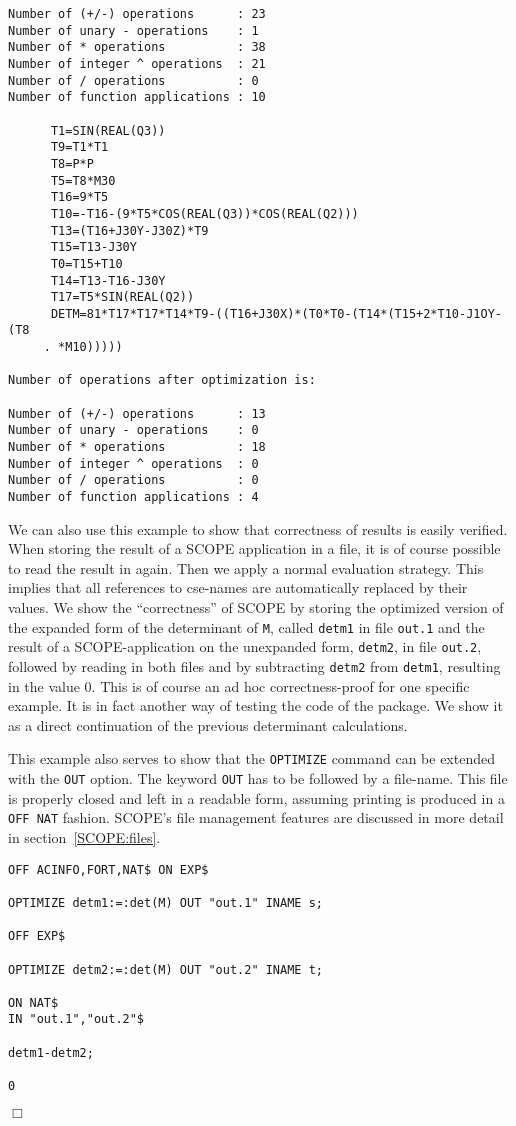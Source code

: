 {\begin{verbatim}
Number of (+/-) operations      : 23
Number of unary - operations    : 1
Number of * operations          : 38
Number of integer ^ operations  : 21
Number of / operations          : 0
Number of function applications : 10

      T1=SIN(REAL(Q3))
      T9=T1*T1
      T8=P*P
      T5=T8*M30
      T16=9*T5
      T10=-T16-(9*T5*COS(REAL(Q3))*COS(REAL(Q2)))
      T13=(T16+J30Y-J30Z)*T9
      T15=T13-J30Y
      T0=T15+T10
      T14=T13-T16-J30Y
      T17=T5*SIN(REAL(Q2))
      DETM=81*T17*T17*T14*T9-((T16+J30X)*(T0*T0-(T14*(T15+2*T10-J1OY-(T8
     . *M10)))))

Number of operations after optimization is:

Number of (+/-) operations      : 13
Number of unary - operations    : 0
Number of * operations          : 18
Number of integer ^ operations  : 0
Number of / operations          : 0
Number of function applications : 4
\end{verbatim}}

We can also use this example to show that correctness of results is
easily verified. When storing
the result of a SCOPE application in a file, it is of course possible
to read the result in again. Then we apply a normal {\REDUCE} evaluation
strategy. This implies that all references to cse-names are automatically
replaced by their values.  We show the ``correctness'' of SCOPE by
storing the optimized version of the expanded form of the determinant
of {\tt M}, called {\tt detm1} in file {\tt out.1} and the result of a
SCOPE-application on the unexpanded form, {\tt detm2}, in file {\tt out.2},
followed by reading in both files and by subtracting {\tt detm2}
from {\tt detm1}, resulting in the value 0.
This is of course an ad hoc correctness-proof for one specific
example. It is in fact another way of testing the code of the package.
We show it as a direct continuation of the previous determinant calculations.

This example also serves to show that the {\tt OPTIMIZE} command can be
extended with the {\tt OUT} option. The keyword {\tt OUT} has to be followed
by a file-name. This file is properly closed and left in a readable form,
assuming printing is produced in a {\tt OFF NAT} fashion.
SCOPE's file management features are discussed in more detail in
section~\ref{SCOPE:files}.
{\small
\begin{verbatim}
OFF ACINFO,FORT,NAT$ ON EXP$

OPTIMIZE detm1:=:det(M) OUT "out.1" INAME s;

OFF EXP$

OPTIMIZE detm2:=:det(M) OUT "out.2" INAME t;

ON NAT$
IN "out.1","out.2"$

detm1-detm2;

0
\end{verbatim}
\begin{flushright}
$\Box$
\end{flushright}}

